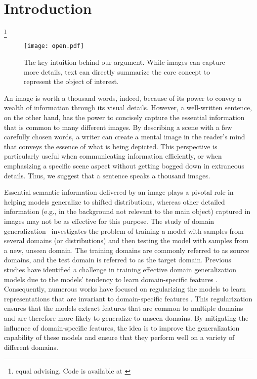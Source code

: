 \documentclass[10pt,twocolumn,letterpaper]{article}
\newcommand\blfootnote[1]{\begingroup
  \renewcommand\thefootnote{}\footnote{#1}\addtocounter{footnote}{-1}\endgroup
}
\begin{document}
\section{Introduction}
\blfootnote{ equal advising. Code is available at \href{https://github.com/OoDBag/RISE}{\color{black}{github.com/OoDBag/RISE}}}
\begin{figure}
    \centering
    \texttt{[image: open.pdf]}
    \caption{The key intuition behind our argument. While images can capture more details, text can directly summarize the core concept to represent the object of interest.}
    \label{fig:open}
\end{figure}

An image is worth a thousand words, 
indeed,  because of its power to convey a wealth of information through its visual details.
However,  a well-written sentence, on the other hand, has the power to concisely capture the essential information that is common to many 
different images. 
By describing a scene with a few carefully chosen words, 
a writer can create a mental image in the reader's mind that conveys the essence of what is being depicted. This perspective is particularly useful when 
communicating information efficiently, 
or when emphasizing a specific scene aspect without getting bogged down in extraneous details.
Thus, 
we suggest that 
a sentence speaks a thousand images. 

Essential semantic information delivered by an image plays a pivotal role in helping models generalize to shifted distributions, whereas other detailed information (e.g., in the background not relevant to the main object) captured in images may not be as effective for this purpose. The study of domain generalization~\cite{muandet2013domain} investigates the problem of training a model with samples from several domains (or distributions) and then testing the model with samples from a new, unseen domain. The training domains are commonly referred to as source domains, and the test domain is referred to as the target domain. Previous studies have identified a challenge in training effective domain generalization models due to the models' tendency to learn domain-specific features \cite{geirhos2018imagenet}. Consequently, numerous works have focused on regularizing the models to learn representations that are invariant to domain-specific features \cite{li2018domain,li2018deep,zhao2020domain,wang2016select,motiian2017unified,carlucci2018agnostic,akuzawa2019adversarial,ge2021supervised,nguyen2021domain,rahman2021discriminative,han2021learning}. This regularization ensures that the models extract features that are common to multiple domains and are therefore more likely to generalize to unseen domains. By mitigating the influence of domain-specific features, the idea is to improve the generalization capability of these models and ensure that they perform well on a variety of different domains.
\end{document}
